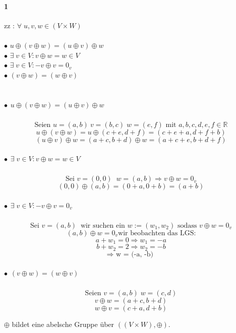 \documentclass[10pt,a4paper]{article}
\begin{document}
\paragraph{1} zz :
$\forall\; u,v,w \in (V\times W)$\\\\
$\bullet $ $ u \oplus (v \oplus w) = (u \oplus v) \oplus w$\\
$\bullet $ $ \exists\; v \in V : v \oplus w = w \in V$\\
$\bullet $ $ \exists \; v \in V : -v \oplus v = 0_v $\\
$\bullet $ $ (v \oplus w) = (w \oplus v)$\\\\
\subparagraph{$\bullet $ $ u \oplus (v \oplus w) = (u \oplus v) \oplus w$}
$$\text{Seien } u= (a,b) \: v=(b,c) \; w=(e,f) \text{ mit } a,b,c,d,e,f \in \mathbb{R}$$
$$ u \oplus (v \oplus w) = u \oplus (c+e,d+f) = (c+e+a,d+f+b)$$
$$ (u \oplus v) \oplus w = (a+c,b+d) \oplus w = (a+c+e,b+d+f)$$
\begin{flushright} \checkmark \end{flushright}
\subparagraph{$\bullet $ $ \exists\; v \in V : v \oplus w = w \in V$}
$$ \text{Sei } v = (0,0) \;\; w = (a ,b) \Rightarrow v \oplus w = 0_v $$
$$ (0,0) \oplus (a,b) = (0+a,0+b) = (a+b) $$
\begin{flushright} \checkmark \end{flushright}
\subparagraph{$\bullet $ $ \exists \; v \in V : -v \oplus v = 0_v $}
$$ \text{Sei } v = (a,b) \;\; \text{wir suchen ein } w:=(w_1,w_2) \text{ sodass } v \oplus w = 0_v$$
$$ (a,b) \oplus w = 0_v \text{wir beobachten das LGS:}$$
$$ a + w_1 = 0 \Rightarrow w_1 = -a $$
$$ b + w_2 = 2 \Rightarrow w_2 = -b $$
$$\Rightarrow \text{ w = (-a, -b) }$$
\begin{flushright} \checkmark \end{flushright}
\subparagraph{$\bullet $ $ (v \oplus w) = (w \oplus v)$}
$$ \text{Seien } v = (a,b) \; w = (c,d) $$
$$ v \oplus w = (a+c,b+d)$$
$$ w \oplus v = (c+a, d+b)$$ 
\begin{flushright} \checkmark \end{flushright}
$\oplus$ bildet eine abelsche Gruppe über $((V\times W), \oplus)$.
\end{document}
